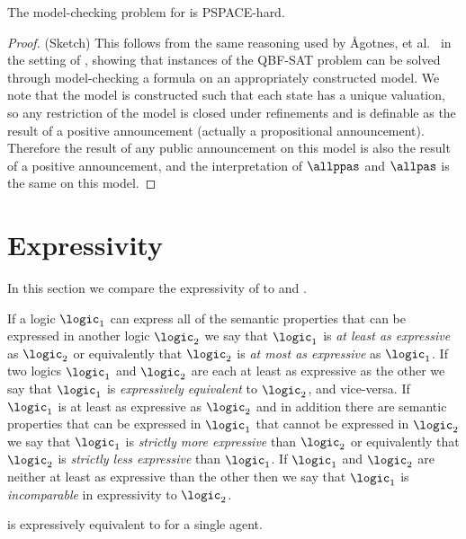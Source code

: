 \begin{theorem}\label{papal-model-checking-pspace-hard}
The model-checking problem for \logicPapalS{} is PSPACE-hard.
\end{theorem}

\begin{proof}{(Sketch)}
This follows from the same reasoning used by Ågotnes, et al.~\cite{agotnes:2010} in the setting of \logicApalS{}, showing that instances of the QBF-SAT problem can be solved through model-checking a \langPapal{} formula on an appropriately constructed model.
We note that the model is constructed such that each state has a unique valuation, so any restriction of the model is closed under refinements and is definable as the result of a positive announcement (actually a propositional announcement).
Therefore the result of any public announcement on this model is also the result of a positive announcement, and the interpretation of $\allppas$ and $\allpas$ is the same on this model.
\end{proof}

\section{Expressivity}\label{expressivity}

In this section we compare the expressivity of \logicPapalS{} to \logicPalS{} and \logicApalS{}.

If a logic $\logic_1$ can express all of the semantic properties that can be expressed in another logic $\logic_2$ we say that $\logic_1$ is {\em at least as expressive} as $\logic_2$ or equivalently that $\logic_2$ is {\em at most as expressive} as $\logic_1$.
If two logics $\logic_1$ and $\logic_2$ are each at least as expressive as the other we say that $\logic_1$ is {\em expressively equivalent} to $\logic_2$, and vice-versa.
If $\logic_1$ is at least as expressive as $\logic_2$ and in addition there are semantic properties that can be expressed in $\logic_1$ that cannot be expressed in $\logic_2$ we say that $\logic_1$ is {\em strictly more expressive} than $\logic_2$ or equivalently that $\logic_2$ is {\em strictly less expressive} than $\logic_1$.
If $\logic_1$ and $\logic_2$ are neither at least as expressive than the other then we say that $\logic_1$ is {\em incomparable} in expressivity to $\logic_2$.

\begin{theorem}
\logicPapalS{} is expressively equivalent to \logicPalS{} for a single agent.
\end{theorem}

